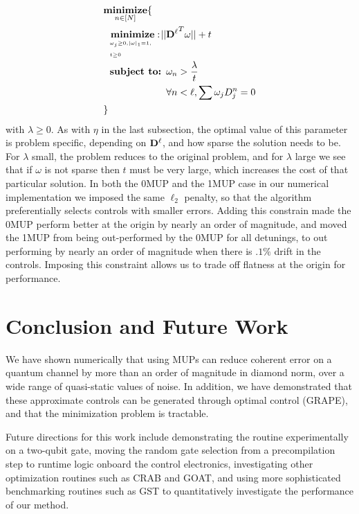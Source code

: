 \documentclass[aps,nofootinbib,pra,notitlepage,twocolumn]{revtex4-1}
\begin{document}
\begin{equation}\label{eq:minimization_regularization}
\begin{split}
&\underset{n\in[N]}{\textbf{minimize}}\{\\
&\ \ \bunderbrace{\textbf{minimize}: }{\omega_j\geq0, |\omega|_1=1,\\ t\geq0} ||{\bold{D}^{\ell}}^T\omega|| + t\\
&\ \ \textbf{subject to: } \omega_n > \frac{\lambda}{t}\\
&\ \ \phantom{\textbf{subject to: }} \forall n<\ell, \sum \omega_jD_j^n=0\\
&\}
\end{split}
\end{equation} with $\lambda\geq0$. As with $\eta$ in the last subsection, the optimal value of this parameter is problem specific, depending on $\bold{D}^\ell$, and how sparse the solution needs to be. For $\lambda$ small, the problem reduces to the original problem, and for $\lambda$ large we see that if $\omega$ is not sparse then $t$ must be very large, which increases the cost of that particular solution.
In both the 0MUP and the 1MUP case in our numerical implementation we imposed the same $\ell_2$ penalty, so that the algorithm preferentially selects controls with smaller errors. Adding this constrain made the 0MUP perform better at the origin by nearly an order of magnitude, and moved the 1MUP from being out-performed by the 0MUP for all detunings, to out performing by nearly an order of magnitude when there is $.1\%$ drift in the controls. Imposing this constraint allows us to trade off flatness at the origin for performance.



\section{Conclusion and Future Work}
We have shown numerically that using MUPs can reduce coherent error on a quantum channel by more than an order of magnitude in diamond norm, over a wide range of quasi-static values of noise. In addition, we have demonstrated that these approximate controls can be generated through optimal control (GRAPE), and that the minimization problem is tractable.

Future directions for this work include demonstrating the routine experimentally on a two-qubit gate, moving the random gate selection from a precompilation step to runtime logic onboard the control electronics, investigating other optimization routines such as CRAB \cite{Caneva2011} and GOAT\cite{Machnes2018}, and using more sophisticated benchmarking routines such as GST\cite{BlumeKohout2017} to quantitatively investigate the performance of our method.
\end{document}
